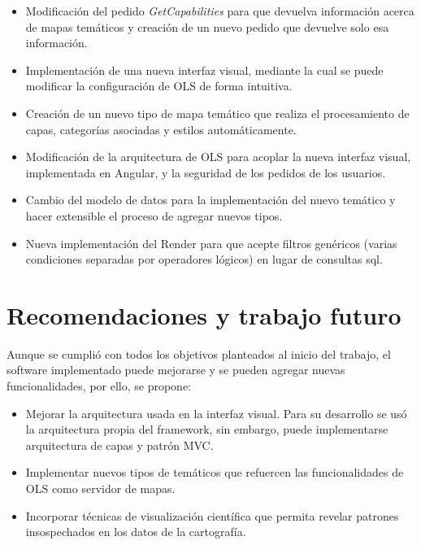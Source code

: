 \begin{itemize}
\item Modificaci\'on del pedido \textit{GetCapabilities} para que devuelva informaci\'on acerca de mapas tem\'aticos y creaci\'on de un nuevo pedido que devuelve solo esa informaci\'on.
\item Implementaci\'on de una nueva interfaz visual, mediante la cual se puede modificar la configuraci\'on de OLS de forma intuitiva.
\item Creaci\'on de un nuevo tipo de mapa tem\'atico que realiza el procesamiento de capas, categor\'ias asociadas y estilos autom\'aticamente.
\item Modificaci\'on de la arquitectura de OLS para acoplar la nueva interfaz visual, implementada en Angular, y la seguridad de los pedidos de los usuarios.
\item Cambio del modelo de datos para la implementaci\'on del nuevo tem\'atico y hacer extensible el proceso de agregar nuevos tipos.
\item Nueva implementaci\'on del Render para que acepte filtros gen\'ericos (varias condiciones separadas por operadores l\'ogicos) en lugar de consultas sql.
\end{itemize}


\section{Recomendaciones y trabajo futuro}
Aunque se cumpli\'o con todos los objetivos planteados al inicio del trabajo, el software implementado puede mejorarse y se pueden agregar nuevas funcionalidades, por ello, se propone:

\begin{itemize}
\item Mejorar la arquitectura usada en la interfaz visual. Para su desarrollo se us\'o la arquitectura propia del framework, sin embargo, puede implementarse arquitectura de capas y patr\'on MVC.
\item Implementar nuevos tipos de tem\'aticos que refuercen las funcionalidades de OLS como servidor de mapas.
\item Incorporar t\'ecnicas de visualizaci\'on cient\'ifica que permita revelar patrones insospechados en los datos de la cartograf\'ia.
\end{itemize}